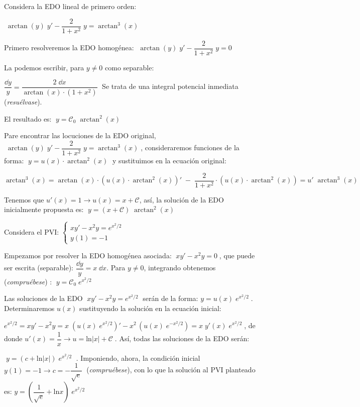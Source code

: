 \begin{cuadro-gris}
\begin{ejem}
Considera la EDO lineal de primero orden: 

$\; \arctan(y)\; y'- \dfrac {2}{1+x^2}\; y=\arctan^3 (x)\; $	

Primero resolveremos la EDO homogénea: $\; \arctan(y)\; y'- \dfrac {2}{1+x^2} \; y=0\; $

La podemos escribir, para $y\neq 0$ como separable:

$\dfrac {\dd y}{y }= \dfrac {2\; \dd x} {\arctan (x) \cdot (1+x^2)}  \; $ Se trata de una integral potencial inmediata (\emph{resuélvase}). 

El resultado es: $\; y=\mathcal {C}_0 \; \arctan^2 (x)$ 

Pare encontrar las locuciones de la EDO original, $\; \arctan(y)\; y'- \dfrac {2}{1+x^2}\; y=\arctan^3 (x)\; $, consideraremos funciones de la forma: $\; y=u(x) \cdot  \arctan^2 (x)\; $ y sustituimos en la ecuación original:

$\arctan^3 (x)= \arctan (x) \cdot \left( u(x)\cdot \arctan^2 (x) \right)' \; - \; \dfrac {2}{1+x^2} \cdot \left( u(x) \cdot  \arctan^2 (x) \right) = u'\; \arctan^3 (x)$

Tenemos que $u'(x)=1 \to u(x)=x+\mathcal C$, así, la solución de la EDO inicialmente propuesta es: 
$\; y=(x+	\mathcal C)\; \arctan^2 (x)$

\end{ejem}
\end{cuadro-gris}

\begin{cuadro-gris}
\begin{ejem}

Considera el PVI: $\begin{cases} xy'-x^2y=e^{x^2/2} \\ y(1)=-1 \end{cases}$

Empezamos por resolver la EDO homogénea asociada: $\; xy'-x^2y=0\; $, que puede ser escrita (separable): $\dfrac {\dd y}{y}=x\; \dd x$. Para $y\neq 0$, integrando obtenemos (\emph{compruébese}) : $\; y=\mathcal{C}_0\; e^{x^2/2} \; $ 

Las soluciones de la EDO $\; xy'-x^2y=e^{x^2/2} \; $ serán de la forma: $y=u(x)\; e^{x^2/2}\; $. Determinaremos $u(x)$ sustituyendo la solución en la ecuación inicial:

$e^{x^2/2}=xy'-x^2y=x\; \left( u(x)\; e^{x^2/2} \right)' - x^2\, \left( u(x)\; e^{-x^2/2} \right) =x\; y'(x)\; e^{x^2/2}\; $, de donde $u'(x)= \dfrac {1} {x} \to u=\mathrm{ln}|x|+\mathcal C\; $. Así, todas las soluciones de la EDO serán: 

$\; y=\left(c+\mathrm{ln}|x| \right)\; e^{x^2/2}\;$ . Imponiendo, ahora, la condición inicial $y(1)=-1 \to c=-\dfrac {1}{\sqrt{e}}\;$ (\emph{compruébese}), con lo que la solución al PVI planteado es: 
$y=\left( \dfrac {1}{\sqrt{e}} + \mathrm{ln} x  \right) \; e^{x^2/2}$

\end{ejem}
\end{cuadro-gris}

